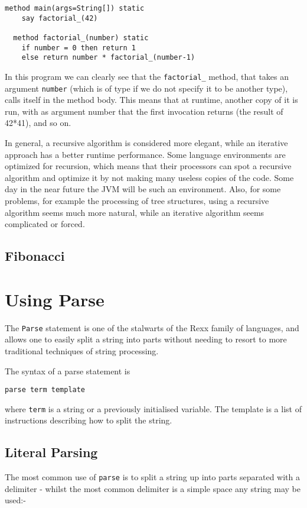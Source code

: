 {\begin{lstlisting}[label=factorialrecursive, caption=Factorial Recursive]
  method main(args=String[]) static
    say factorial_(42)

  method factorial_(number) static
    if number = 0 then return 1
    else return number * factorial_(number-1)

\end{lstlisting}
In this program we can clearly see that the \texttt{factorial\_} method, that
takes an argument \texttt{number} (which is of type \Rexx{} if we do not
specify it to be another type), calls itself in the method body. This
means that at runtime, another copy of it is run, with as argument
number that the first invocation returns (the result of 42*41), and so
on.

In general, a recursive algorithm is considered more elegant, while an
iterative approach has a better runtime performance. Some language
environments are optimized for recursion, which means that their
processors can spot a recursive algorithm and optimize it by not
making many useless copies of the code. Some day in the near future
the JVM will be such an environment. Also, for some problems, for example
the processing of tree structures, using a recursive algorithm seems
much more natural, while an iterative algorithm seems complicated or forced.
\section{Fibonacci}

\chapter{Using Parse}
The \texttt{Parse} statement is one of the stalwarts of the Rexx
family of languages, and allows one to easily split a string into parts without needing to resort to more traditional techniques of string processing.

The syntax of a parse statement is 

\begin{verbatim}
parse term template 
\end{verbatim}
where \texttt{term} is a string or a previously initialised variable. The template is a list of instructions describing how to split the string.

\section{Literal Parsing}
The most common use of \texttt{parse} is to split a string up into parts separated with a delimiter - whilst the most common delimiter is a simple space any string may be used:-

}

